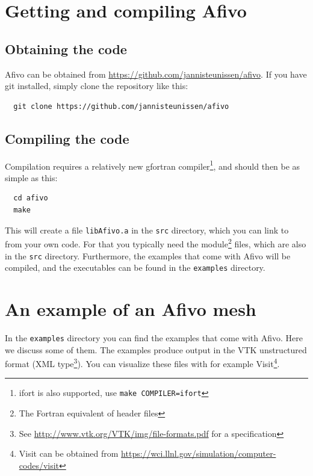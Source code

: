 \documentclass[a4paper, a4wide]{article}
\begin{document}
\section{Getting and compiling Afivo}
\label{sec:getting-started}

\subsection{Obtaining the code}
\label{sec:obtaining}

Afivo can be obtained from \url{https://github.com/jannisteunissen/afivo}. If
you have git installed, simply clone the repository like this:

\begin{lstlisting}
  git clone https://github.com/jannisteunissen/afivo
\end{lstlisting}

\subsection{Compiling the code}
\label{sec:compilation}

Compilation requires a relatively new gfortran compiler\footnote{ifort is also
  supported, use \texttt{make COMPILER=ifort}}, and should then be as simple as
this:
\begin{lstlisting}
  cd afivo
  make
\end{lstlisting}
This will create a file \texttt{libAfivo.a} in the \texttt{src} directory, which
you can link to from your own code.
For that you typically need the module\footnote{The Fortran equivalent of header
  files} files, which are also in the \texttt{src} directory.
Furthermore, the examples that come with Afivo will be compiled, and the
executables can be found in the \texttt{examples} directory.

\lstset{language=[08]Fortran}
\section{An example of an Afivo mesh}
\label{sec:examples}

In the \texttt{examples} directory you can find the
examples that come with Afivo.
Here we discuss some of them.
The examples produce output in the VTK unstructured format (XML
type\footnote{See \url{http://www.vtk.org/VTK/img/file-formats.pdf} for a
  specification}).
You can visualize these files with for example Visit\footnote{Visit can be
  obtained from \url{https://wci.llnl.gov/simulation/computer-codes/visit}}.
\end{document}
